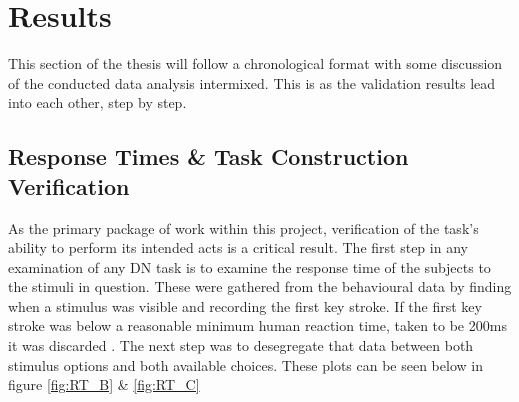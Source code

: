 \chapter{Results}
This section of the thesis will follow a chronological format  with some discussion of the conducted data analysis intermixed. This is as the validation results lead into each other, step by step.

\section{Response Times \& Task Construction Verification}
As the primary package of work within this project, verification of the task's ability to perform its intended acts is a critical result. The first step in any examination of any DN task is to examine the response time of the subjects to the stimuli in question. These were gathered from the behavioural data by finding when a stimulus was visible and recording the first key stroke. If the first key stroke was below a reasonable minimum human reaction time, taken to be 200ms it was discarded \citep{jainComparativeStudyVisual2015}. The next step was to desegregate that data between both stimulus options and both available choices. These plots can be seen below in figure \ref{fig:RT_B} \& \ref{fig:RT_C}


